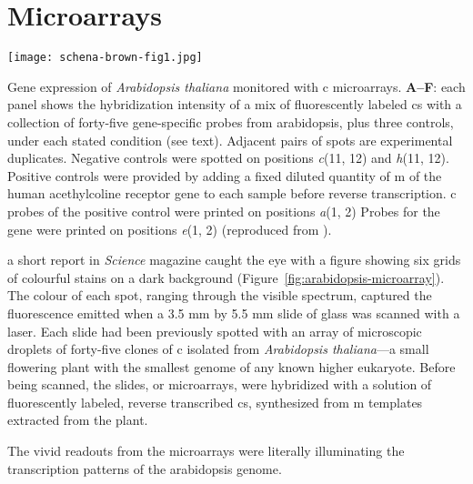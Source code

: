\section{Microarrays}

\begin{marginfigure}%
  \texttt{[image: schena-brown-fig1.jpg]}
  \caption[Gene expression of \emph{Arabidopsis thaliana} monitored with
  c microarrays]{Gene expression of \emph{Arabidopsis thaliana}
    monitored with c microarrays. \textbf{A--F}: each panel shows
    the hybridization intensity of a mix of fluorescently labeled
    cs with a collection of \mbox{forty-five}
    \mbox{gene-specific} probes from arabidopsis, plus three controls, under
    each stated condition (see text).  Adjacent pairs of spots are experimental
    duplicates.  Negative controls were spotted on positions \emph{c}(11, 12)
    and \emph{h}(11, 12).  Positive controls were provided by adding a fixed
    diluted quantity of m of the human acethylcoline receptor
    gene to each sample before reverse transcription.  c probes
    of the positive control were printed on positions \emph{a}(1, 2) Probes for
    the \emph{} gene were printed on positions \emph{e}(1, 2)
    (reproduced from \citealp{schena_quantitative_1995}).}
  \label{fig:arabidopsis-microarray}
\end{marginfigure}

 a short report in \emph{Science} magazine caught
the eye with a figure showing six grids of colourful stains on a dark background
(Figure~\ref{fig:arabidopsis-microarray}).  The colour of each spot, ranging
through the visible spectrum, captured the fluorescence emitted when a 3.5 mm by
5.5 mm slide of glass was scanned with a laser.  Each slide had been previously
spotted with an array of microscopic droplets of \mbox{forty-five} clones of
c isolated from \emph{Arabidopsis thaliana}---a small flowering
plant with the smallest genome of any known higher eukaryote.  Before being
scanned, the slides, or microarrays, were hybridized with a solution of
fluorescently labeled, reverse transcribed cs, synthesized from
m templates extracted from the plant.


The vivid readouts from the microarrays were literally illuminating the
transcription patterns of the arabidopsis genome.

